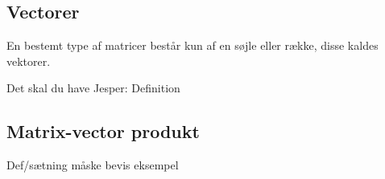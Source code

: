 \subsection{Vectorer}
En bestemt type af matricer består kun af en søjle eller række, disse kaldes vektorer. 

Det skal du have Jesper:
Definition



\subsection{Matrix-vector produkt}

Def/sætning
måske bevis
eksempel
